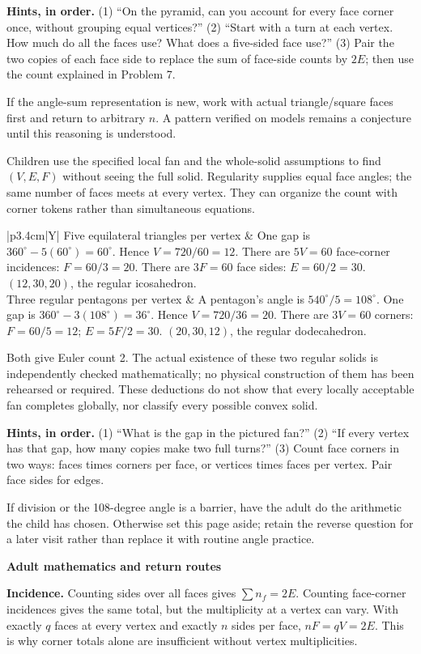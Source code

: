 \documentclass[11pt,letterpaper]{article}
\newcommand{\titleline}[1]{\par{\Large\bfseries #1}\par\vspace{4pt}}
\newcommand{\sub}[1]{\par\vspace{3pt}{\bfseries #1}\par}
\newcommand{\hints}[3]{\textbf{Hints, in order.} (1) #1 (2) #2 (3) #3\par}
\newcommand{\degc}{^{\circ}}
\begin{document}
\hints{``On the pyramid, can you account for every face corner once, without grouping equal vertices?''}{``Start with a turn at each vertex. How much do all the faces use? What does a five-sided face use?''}{Pair the two copies of each face side to replace the sum of face-side counts by $2E$; then use the count explained in Problem 7.}
If the angle-sum representation is new, work with actual triangle/square faces first and return to arbitrary $n$. A pattern verified on models remains a conjecture until this reasoning is understood.

\sub{Problem 9 / student p.9 / reverse inventory}
Children use the specified local fan and the whole-solid assumptions to find $(V,E,F)$ without seeing the full solid. Regularity supplies equal face angles; the same number of faces meets at every vertex. They can organize the count with corner tokens rather than simultaneous equations.

\begin{tabularx}{\linewidth}{|p{3.4cm}|Y|}\hline
Five equilateral triangles per vertex & One gap is $360\degc-5(60\degc)=60\degc$. Hence $V=720/60=12$. There are $5V=60$ face-corner incidences: $F=60/3=20$. There are $3F=60$ face sides: $E=60/2=30$. \textbf{$(12,30,20)$}, the regular icosahedron.\\\hline
Three regular pentagons per vertex & A pentagon's angle is $540\degc/5=108\degc$. One gap is $360\degc-3(108\degc)=36\degc$. Hence $V=720/36=20$. There are $3V=60$ corners: $F=60/5=12$; $E=5F/2=30$. \textbf{$(20,30,12)$}, the regular dodecahedron.\\\hline
\end{tabularx}
Both give Euler count 2. The actual existence of these two regular solids is independently checked mathematically; no physical construction of them has been rehearsed or required. These deductions do not show that every locally acceptable fan completes globally, nor classify every possible convex solid.

\hints{``What is the gap in the pictured fan?''}{``If every vertex has that gap, how many copies make two full turns?''}{Count face corners in two ways: faces times corners per face, or vertices times faces per vertex. Pair face sides for edges.}
If division or the 108-degree angle is a barrier, have the adult do the arithmetic the child has chosen. Otherwise set this page aside; retain the reverse question for a later visit rather than replace it with routine angle practice.

\newpage
\titleline{Adult mathematics and return routes}
\sub{A compact map of the proofs}
\textbf{Incidence.} Counting sides over all faces gives $\sum n_f=2E$. Counting face-corner incidences gives the same total, but the multiplicity at a vertex can vary. With exactly $q$ faces at every vertex and exactly $n$ sides per face, $nF=qV=2E$. This is why corner totals alone are insufficient without vertex multiplicities.
\end{document}
